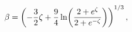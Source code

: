 \[\beta=\left(-\frac{3}{2}\zeta+\frac{9}{4}\mathop{\ln\/}\nolimits\!\left(\frac{%
2+e^{\zeta}}{2+e^{-\zeta}}\right)\right)^{1/3},\]